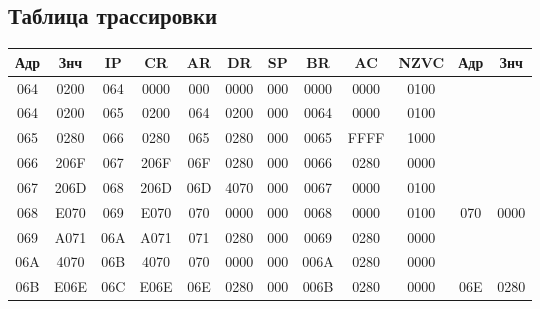 \subsection{Таблица трассировки}
\begin{center}
\begin{tabular}{|c|c|c|c|c|c|c|c|c|c|c|c|}
\hline
\textbf{Адр} & \textbf{Знч} & \textbf{IP} & \textbf{CR} & \textbf{AR} & \textbf{DR} & \textbf{SP} & \textbf{BR} & \textbf{AC} & \textbf{NZVC} & \textbf{Адр} & \textbf{Знч} \\ \hline
064 & 0200 & 064 & 0000 & 000 & 0000 & 000 & 0000 & 0000 & 0100 &  &  \\ \hline
064 & 0200 & 065 & 0200 & 064 & 0200 & 000 & 0064 & 0000 & 0100 &  &  \\ \hline
065 & 0280 & 066 & 0280 & 065 & 0280 & 000 & 0065 & FFFF & 1000 &  &  \\ \hline
066 & 206F & 067 & 206F & 06F & 0280 & 000 & 0066 & 0280 & 0000 &  &  \\ \hline
067 & 206D & 068 & 206D & 06D & 4070 & 000 & 0067 & 0000 & 0100 &  &  \\ \hline
068 & E070 & 069 & E070 & 070 & 0000 & 000 & 0068 & 0000 & 0100 & 070 & 0000 \\ \hline
069 & A071 & 06A & A071 & 071 & 0280 & 000 & 0069 & 0280 & 0000 &  &  \\ \hline
06A & 4070 & 06B & 4070 & 070 & 0000 & 000 & 006A & 0280 & 0000 &  &  \\ \hline
06B & E06E & 06C & E06E & 06E & 0280 & 000 & 006B & 0280 & 0000 & 06E & 0280 \\ \hline

\end{tabular}
\end{center}
